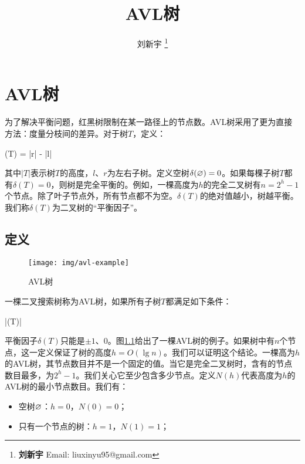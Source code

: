 \documentclass[b5paper]{ctexart}
\begin{document}
\title{AVL树}

\author{刘新宇
\thanks{{\bfseries 刘新宇} \newline
  Email: liuxinyu95@gmail.com \newline}
  }

\maketitle
\fi


\ifx\wholebook\relax
\chapter{AVL树}
\fi

\label{introduction}

为了解决平衡问题，红黑树限制在某一路径上的节点数。AVL树采用了更为直接方法：度量分枝间的差异。对于树$T$，定义：

\be
  \delta(T) = |r| - |l|
\ee

其中$|T|$表示树$T$的高度，$l$、$r$为左右子树。定义空树$\delta(\varnothing) = 0$。如果每棵子树$T$都有$\delta(T) = 0$，则树是完全平衡的。例如，一棵高度为$h$的完全二叉树有$n = 2^h - 1$个节点。除了叶子节点外，所有节点都不为空。$\delta(T)$的绝对值越小，树越平衡。我们称$\delta(T)$为二叉树的“平衡因子”。

\section{定义}

\begin{figure}[htbp]
   \centering
   \texttt{[image: img/avl-example]}
   \caption{AVL树} \label{fig:avl-example}
\end{figure}

一棵二叉搜索树称为AVL树，如果所有子树$T$都满足如下条件：

\be
  |\delta(T)| 
  \label{eq:avl-rule}
\ee

平衡因子$\delta(T)$只能是$\pm 1$、0。图\ref{fig:avl-example}给出了一棵AVL树的例子。如果树中有$n$个节点，这一定义保证了树的高度$h = O(\lg n)$。我们可以证明这个结论。一棵高为$h$的AVL树，其节点数目并不是一个固定的值。当它是完全二叉树时，含有的节点数目最多，为$2^h - 1$。我们关心它至少包含多少节点。定义$N(h)$代表高度为$h$的AVL树的最小节点数目。我们有：

\begin{itemize}
\item 空树$\varnothing$：$h = 0$，$N(0) = 0$；
\item 只有一个节点的树：$h = 1$，$N(1) = 1$；
\end{itemize}
\end{document}
